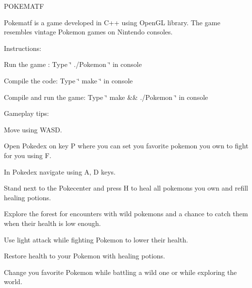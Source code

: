 P\+O\+K\+E\+M\+A\+TF

Pokematf is a game developed in C++ using Open\+GL library. The game resembles vintage Pokemon games on Nintendo consoles.

Instructions\+:


\begin{DoxyItemize}
\item Run the game \+: Type \char`\"{} ./\+Pokemon \char`\"{} in console
\item Compile the code\+: Type \char`\"{} make \char`\"{} in console
\item Compile and run the game\+: Type \char`\"{} make \&\& ./\+Pokemon \char`\"{} in console
\end{DoxyItemize}

Gameplay tips\+:


\begin{DoxyItemize}
\item Move using W\+A\+SD.
\item Open Pokedex on key P where you can set you favorite pokemon you own to fight for you using F.
\item In Pokedex navigate using A, D keys.
\item Stand next to the Pokecenter and press H to heal all pokemons you own and refill healing potions.
\item Explore the forest for encounters with wild pokemons and a chance to catch them when their health is low enough.
\item Use light attack while fighting Pokemon to lower their health.
\item Restore health to your Pokemon with healing potions.
\item Change you favorite Pokemon while battling a wild one or while exploring the world. 
\end{DoxyItemize}